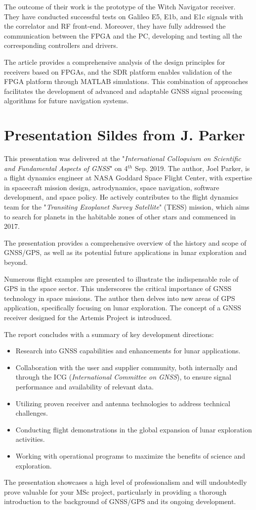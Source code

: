 The outcome of their work is the prototype of the Witch Navigator receiver. They have conducted successful tests on Galileo E5, E1b, and E1c signals with the correlator and RF front-end. Moreover, they have fully addressed the communication between the FPGA and the PC, developing and testing all the corresponding controllers and drivers.

The article provides a comprehensive analysis of the design principles for receivers based on FPGAs, and the SDR platform enables validation of the FPGA platform through MATLAB simulations. This combination of approaches facilitates the development of advanced and adaptable GNSS signal processing algorithms for future navigation systems.

\section{Presentation Sildes from J. Parker\texorpdfstring{\cite{RN146}}{}}
This presentation was delivered at the "\textit{International Colloquium on Scientific and Fundamental Aspects of GNSS}" on 4$^{th}$ Sep. 2019. The author, Joel Parker, is a flight dynamics engineer at NASA Goddard Space Flight Center, with expertise in spacecraft mission design, astrodynamics, space navigation, software development, and space policy. He actively contributes to the flight dynamics team for the "\textit{Transiting Exoplanet Survey Satellite}" (TESS) mission, which aims to search for planets in the habitable zones of other stars and commenced in 2017.

The presentation provides a comprehensive overview of the history and scope of GNSS/GPS, as well as its potential future applications in lunar exploration and beyond.

Numerous flight examples are presented to illustrate the indispensable role of GPS in the space sector. This underscores the critical importance of GNSS technology in space missions. The author then delves into new areas of GPS application, specifically focusing on lunar exploration. The concept of a GNSS receiver designed for the Artemis Project is introduced.

The report concludes with a summary of key development directions:
\begin{itemize}
    \item Research into GNSS capabilities and enhancements for lunar applications.
    \item Collaboration with the user and supplier community, both internally and through the ICG (\textit{International Committee on GNSS}), to ensure signal performance and availability of relevant data.
    \item Utilizing proven receiver and antenna technologies to address technical challenges.
    \item Conducting flight demonstrations in the global expansion of lunar exploration activities.
    \item Working with operational programs to maximize the benefits of science and exploration.
\end{itemize}

The presentation showcases a high level of professionalism and will undoubtedly prove valuable for your MSc project, particularly in providing a thorough introduction to the background of GNSS/GPS and its ongoing development.
